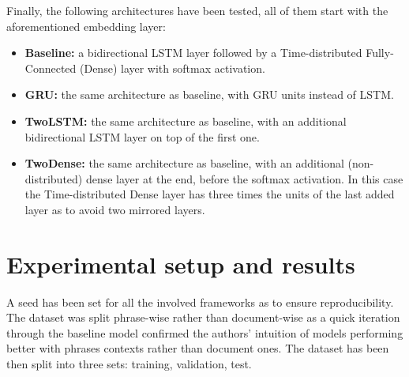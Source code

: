 \documentclass[11pt]{article}
\begin{document}
Finally, the following architectures have been tested, all of them start with the aforementioned embedding layer:
\begin{itemize}
\item[] \textbf{Baseline:} a bidirectional LSTM layer followed by a Time-distributed Fully-Connected (Dense) layer with softmax activation.
\item[] \textbf{GRU:} the same architecture as baseline, with GRU units instead of LSTM.
\item[] \textbf{TwoLSTM:} the same architecture as baseline, with an additional bidirectional LSTM layer on top of the first one.
\item[] \textbf{TwoDense:} the same architecture as baseline, with an additional (non-distributed) dense layer at the end, before the softmax activation. In this case the Time-distributed Dense layer has three times the units of the last added layer as to avoid two mirrored layers.
\end{itemize}


%

\section{Experimental setup and results}
\label{sec:results}


A seed has been set for all the involved frameworks as to ensure reproducibility.  The dataset was split phrase-wise rather than document-wise as a quick iteration through the baseline model confirmed the authors' intuition of models performing better with phrases contexts rather than document ones. The dataset has been then split into three sets: training, validation, test.
\end{document}
